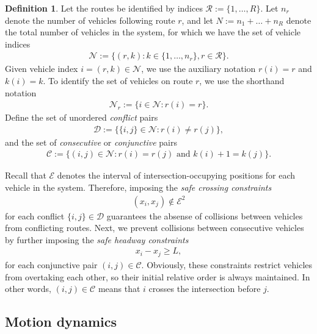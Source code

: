 \documentclass[a4paper]{report}
\theoremstyle{definition}
\newtheorem{define}{Definition}[chapter]
\theoremstyle{plain}
\begin{document}
\begin{define}
Let the routes be identified by indices $\mathcal{R} := \{1, \dots, R\}$. Let
$n_{r}$ denote the number of vehicles following route $r$, and let
$N := n_1 + \dots + n_R$ denote the total number of vehicles in the system, for
which we have the set of vehicle indices
\begin{align}
  \mathcal{N} := \{ (r, k) : k \in \{1, \dots, n_{r}\}, r \in \mathcal{R}\} .
\end{align}
Given vehicle index $i = (r, k) \in \mathcal{N}$, we use
the auxiliary notation $r(i) = r$ and $k(i) = k$.
%
To identify the set of vehicles on route $r$, we use the shorthand notation
\begin{align}
  \mathcal{N}_{r} := \{ i \in \mathcal{N} : r(i) = r \} .
\end{align}
Define the set of unordered \emph{conflict} pairs
\begin{align}
  \mathcal{D} := \{ \{i,j\} \in \mathcal{N} : r(i) \neq r(j) \} ,
\end{align}
and the set of \emph{consecutive} or \emph{conjunctive} pairs
\begin{align}
  \mathcal{C} := \{ (i,j) \in \mathcal{N} : r(i) = r(j) \text{ and } k(i) + 1 = k(j) \} .
\end{align}
\end{define}

\pagebreak[3]
Recall that $\mathcal{E}$ denotes the interval of intersection-occupying
positions for each vehicle in the system. Therefore, imposing the \emph{safe
  crossing constraints}
\begin{align}\label{eq:safe-crossing}
  (x_{i}, x_{j}) \notin \mathcal{E}^{2} 
\end{align}
for each conflict $\{i,j\} \in \mathcal{D}$ guarantees the absense of
collisions between vehicles from conflicting routes.
Next, we prevent collisions between consecutive vehicles by further imposing
the \textit{safe headway constraints}
\begin{align}
  \label{eq:follow_constraints}
  x_{i} - x_{j} \geq L ,
\end{align}
for each conjunctive pair $(i, j) \in \mathcal{C}$. Obviously, these constraints
restrict vehicles from overtaking each other, so their initial relative order is
always maintained. In other words, $(i,j) \in \mathcal{C}$ means that $i$ crosses
the intersection before $j$.


\subsection{Motion dynamics}\label{sec:dynamics}
\end{document}
